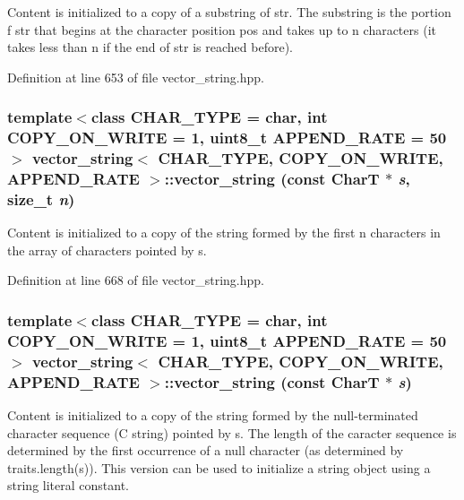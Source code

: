 Content is initialized to a copy of a substring of str. The substring is the portion f str that begins at the character position pos and takes up to n characters (it takes less than n if the end of str is reached before). 

Definition at line 653 of file vector\_\-string.hpp.\hypertarget{classvector__string_345f4bd7b0d68d78718a68f410fa0982}{
\subsubsection[{vector\_\-string}]{\setlength{\rightskip}{0pt plus 5cm}template$<$class CHAR\_\-TYPE  = char, int COPY\_\-ON\_\-WRITE = 1, uint8\_\-t APPEND\_\-RATE = 50$>$ {\bf vector\_\-string}$<$ CHAR\_\-TYPE, COPY\_\-ON\_\-WRITE, APPEND\_\-RATE $>$::{\bf vector\_\-string} (const CharT $\ast$ {\em s}, \/  size\_\-t {\em n})}}
\label{classvector__string_345f4bd7b0d68d78718a68f410fa0982}


Content is initialized to a copy of the string formed by the first n characters in the array of characters pointed by s. 

Definition at line 668 of file vector\_\-string.hpp.\hypertarget{classvector__string_00789b3e4fc51227e7e5ecd83a1a0936}{
\subsubsection[{vector\_\-string}]{\setlength{\rightskip}{0pt plus 5cm}template$<$class CHAR\_\-TYPE  = char, int COPY\_\-ON\_\-WRITE = 1, uint8\_\-t APPEND\_\-RATE = 50$>$ {\bf vector\_\-string}$<$ CHAR\_\-TYPE, COPY\_\-ON\_\-WRITE, APPEND\_\-RATE $>$::{\bf vector\_\-string} (const CharT $\ast$ {\em s})}}
\label{classvector__string_00789b3e4fc51227e7e5ecd83a1a0936}


Content is initialized to a copy of the string formed by the null-terminated character sequence (C string) pointed by s. The length of the caracter sequence is determined by the first occurrence of a null character (as determined by traits.length(s)). This version can be used to initialize a string object using a string literal constant. 

